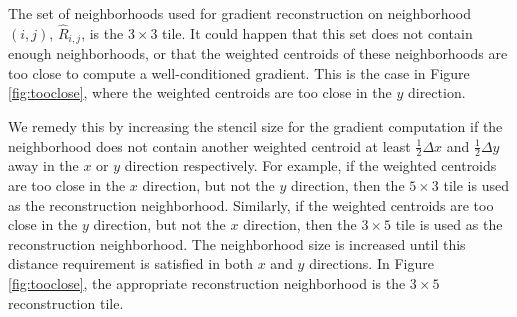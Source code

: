 The set of neighborhoods used for gradient reconstruction on neighborhood $(i,j)$, $\widehat R_{i,j}$, is the $3 \times 3$ tile.
It could happen that this set does not contain enough neighborhoods, or that the weighted centroids of these neighborhoods are too close to compute a well-conditioned gradient.
This is the case in Figure \ref{fig:tooclose}, where the weighted centroids are too close in the $y$ direction.

We remedy this by increasing the stencil size for the gradient computation 
if the neighborhood does not contain another weighted centroid at least  
$\frac{1}{2}\Delta x$  and $\frac{1}{2}\Delta y$ away  in the $x$ or $y$ 
direction respectively.
For example, if the weighted centroids are too close in the $x$ 
direction, but not the $y$ direction, then the $5\times 3$ tile is used as the 
reconstruction neighborhood.  Similarly, if the weighted centroids are too 
close in the $y$ direction, but not the $x$ direction, then the $3\times 5$ tile is 
used as the reconstruction neighborhood.  The neighborhood size is increased until this distance requirement is satisfied in both $x$ and $y$ directions.  In Figure \ref{fig:tooclose},
the appropriate reconstruction neighborhood is the $3\times 5$ reconstruction tile.

